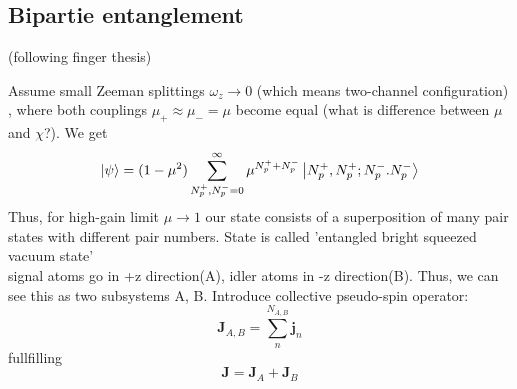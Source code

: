 \subsection{Bipartie entanglement} (following finger thesis)

Assume small Zeeman splittings $\omega_z \rightarrow 0$ (which means two-channel configuration) , where both couplings $\mu_+ \approx \mu_- = \mu$ become equal (what is difference between $\mu$ and $\chi$?). We get
\begin{equation}
	\ket{\psi} = (1-\mu^2) \sum_{N_p^+,N_p^- = 0}^\infty \mu^{N_p^+ + N_p^-} \ket{N_p^+,N_p^+;N_p^-.N_p^-}
\end{equation}
Thus, for high-gain limit $\mu \rightarrow 1$ our state consists of a superposition of many pair states with different pair numbers. State is called 'entangled bright squeezed vacuum state'
\\
signal atoms go in +z direction(A), idler atoms in -z direction(B). Thus, we can see this as two subsystems A, B. Introduce collective pseudo-spin operator: 
\begin{equation}
	\bm{J}_{A,B} = \sum_n^{N_{A,B}} \bm{j}_n 
\end{equation}
fullfilling
\begin{equation}
	\bm{J} = \bm{J}_A+ \bm{J}_B
\end{equation}

